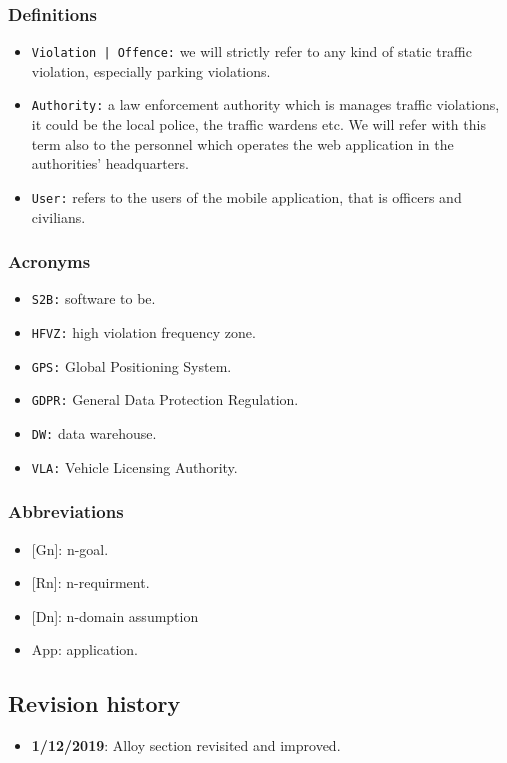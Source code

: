 \documentclass[12pt,a4paper]{article}
\begin{document}
\subsubsection{Definitions}
 \begin{itemize}
\item \texttt{Violation | Offence:} we will strictly refer to any kind of static traffic violation, especially parking violations. 
\item \texttt{Authority:} a law enforcement authority which is manages traffic violations, it could be the local police, the traffic wardens etc. We will refer with this term also to the personnel which operates the web application in the authorities' headquarters.
\item \texttt{User:} refers to the users of the mobile application, that is officers and civilians.
\end{itemize}
\subsubsection{Acronyms}
\begin{itemize}
\item \texttt{S2B:} software to be.
\item \texttt{HFVZ:} high violation frequency zone.
\item \texttt{GPS:} Global Positioning System.
\item \texttt{GDPR:} General Data Protection Regulation.
\item \texttt{DW:} data warehouse.
\item \texttt{VLA:} Vehicle Licensing Authority.
\end{itemize}
\subsubsection{Abbreviations}
\begin{itemize}
				\item {[Gn]}: n-goal.
				\item {[Rn]}: n-requirment.
				\item {[Dn]}: n-domain assumption
				\item {App}: application.
			\end{itemize}
\subsection{Revision history} 
\begin{itemize}
\item \textbf{1/12/2019}: Alloy section revisited and improved.
\end{itemize}
\end{document}
